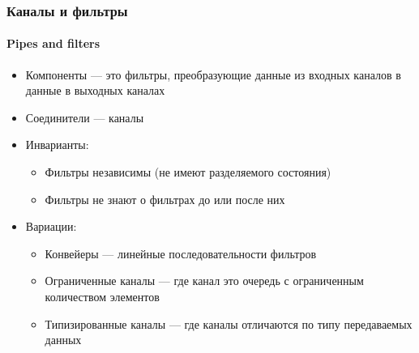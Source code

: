 \documentclass{../../slides-style}
\begin{document}
    \begin{frame}
        \frametitle{Каналы и фильтры}
        \framesubtitle{Pipes and filters}
        \begin{itemize}
            \item Компоненты --- это фильтры, преобразующие данные из входных каналов в данные в выходных каналах
            \item Соединители --- каналы
            \item Инварианты:
            \begin{itemize}
                \item Фильтры независимы (не имеют разделяемого состояния)
                \item Фильтры не знают о фильтрах до или после них
            \end{itemize}
            \item Вариации:
            \begin{itemize}
                \item Конвейеры --- линейные последовательности фильтров
                \item Ограниченные каналы --- где канал это очередь с ограниченным количеством элементов
                \item Типизированные каналы --- где каналы отличаются по типу передаваемых данных
            \end{itemize}
        \end{itemize}
    \end{frame}
\end{document}
